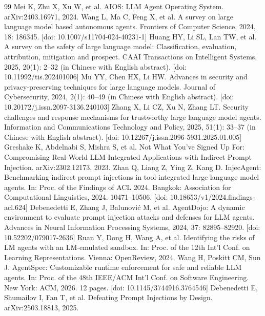{\scriptsize
\begin{thebibliography}{99}
\setlength{\itemsep}{0pt}
\setlength{\parskip}{0pt}
 Mei K, Zhu X, Xu W, et al. AIOS: LLM Agent Operating System. arXiv:2403.16971, 2024.
 Wang L, Ma C, Feng X, et al. A survey on large language model based autonomous agents. Frontiers of Computer Science, 2024, 18: 186345. [doi: 10.1007/s11704-024-40231-1]
 Huang HY, Li SL, Lan TW, et al. A survey on the safety of large language model: Classification, evaluation, attribution, mitigation and prospect. CAAI Transactions on Intelligent Systems, 2025, 20(1): 2--32 (in Chinese with English abstract). [doi: 10.11992/tis.202401006]
 Mu YY, Chen HX, Li HW. Advances in security and privacy-preserving techniques for large language models. Journal of Cybersecurity, 2024, 2(1): 40--49 (in Chinese with English abstract). [doi: 10.20172/j.issn.2097-3136.240103]
 Zhang X, Li CZ, Xu N, Zhang LT. Security challenges and response mechanisms for trustworthy large language model agents. Information and Communications Technology and Policy, 2025, 51(1): 33--37 (in Chinese with English abstract). [doi: 10.12267/j.issn.2096-5931.2025.01.005]
 Greshake K, Abdelnabi S, Mishra S, et al. Not What You've Signed Up For: Compromising Real-World LLM-Integrated Applications with Indirect Prompt Injection. arXiv:2302.12173, 2023.
 Zhan Q, Liang Z, Ying Z, Kang D. InjecAgent: Benchmarking indirect prompt injections in tool-integrated large language model agents. In: Proc. of the Findings of ACL 2024. Bangkok: Association for Computational Linguistics, 2024. 10471--10506. [doi: 10.18653/v1/2024.findings-acl.624]
 Debenedetti E, Zhang J, Balunovi\'{c} M, et al. AgentDojo: A dynamic environment to evaluate prompt injection attacks and defenses for LLM agents. Advances in Neural Information Processing Systems, 2024, 37: 82895--82920. [doi: 10.52202/079017-2636]
 Ruan Y, Dong H, Wang A, et al. Identifying the risks of LM agents with an LM-emulated sandbox. In: Proc. of the 12th Int'l Conf. on Learning Representations. Vienna: OpenReview, 2024.
 Wang H, Poskitt CM, Sun J. AgentSpec: Customizable runtime enforcement for safe and reliable LLM agents. In: Proc. of the 48th IEEE/ACM Int'l Conf. on Software Engineering. New York: ACM, 2026. 12 pages. [doi: 10.1145/3744916.3764546]
 Debenedetti E, Shumailov I, Fan T, et al. Defeating Prompt Injections by Design. arXiv:2503.18813, 2025.

\end{thebibliography}}
